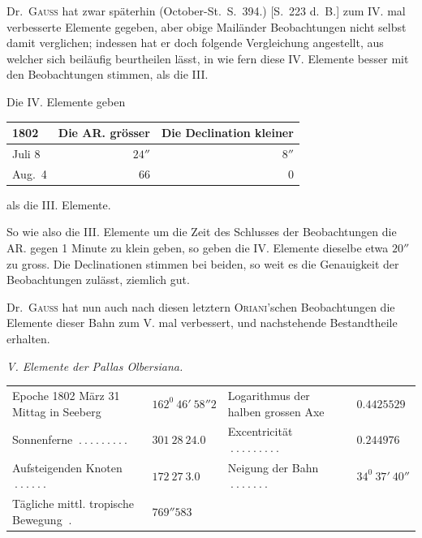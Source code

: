 Dr.\ \textsc{Gauss} hat zwar späterhin (October-St.\ S.\ 394.) [S.\ 223 d.\ B.] zum IV. mal verbesserte Elemente gegeben, aber obige Mailänder Beobachtungen nicht selbst damit verglichen; indessen hat er doch folgende Vergleichung angestellt, aus welcher sich beiläufig beurtheilen lässt, in wie fern diese IV. Elemente besser mit den Beobachtungen stimmen, als die III.
\begin{center}
Die IV. Elemente geben\par\medskip
\begin{tabular}{l|r|r}
1802&Die AR. grösser&Die Declination kleiner\\\hline
Juli 8&$24''$&$8''$\\
Aug.\ 4&$66$&$0$
\end{tabular}\par\medskip
als die III. Elemente.
\end{center}

So wie also die III. Elemente um die Zeit des Schlusses der Beobachtungen die AR. gegen 1 Minute zu klein geben, so geben die IV. Elemente dieselbe etwa $20''$ zu gross. Die Declinationen stimmen bei beiden, so weit es die Genauigkeit der Beobachtungen zulässt, ziemlich gut.

Dr.\ \textsc{Gauss} hat nun auch nach diesen letztern \textsc{Oriani}'schen Beobachtungen die Elemente dieser Bahn zum V. mal verbessert, und nachstehende Bestandtheile erhalten.
\begin{center}\textit{V. Elemente der Pallas Olbersiana.}\end{center}
\begin{center}
\begingroup\fontsize{8}{10}\selectfont\setlength{\tabcolsep}{2pt}
\begin{tabular}{@{}p{.35\linewidth}l|p{.33\linewidth}l@{}}
Epoche 1802 März 31 Mittag in Seeberg&$162^0\ 46'\ 58''2$&Logarithmus der halben grossen Axe&$0.4425529$\\
Sonnenferne $\ .\ .\ .\ .\ .\ .\ .\ .\ .$&$301\ 28\ 24.0$&Excentricität $\ .\ .\ .\ .\ .\ .\ .\ .\ .$&$0.244976$\\
Aufsteigenden Knoten $\ .\ .\ .\ .\ .\ .$&$172\ 27\ 3.0$&Neigung der Bahn $\ .\ .\ .\ .\ .\ .\ .$&$34^0\ 37'\ 40''$\\
Tägliche mittl. tropische Bewegung $\ .$&$769''583$&&
\end{tabular}\endgroup
\end{center}


